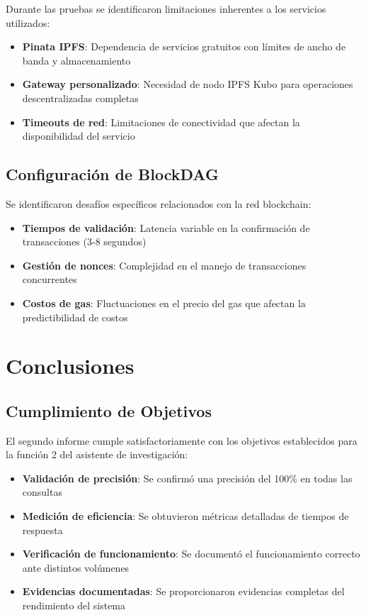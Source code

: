 \documentclass[onecolumn]{article}
\begin{document}
Durante las pruebas se identificaron limitaciones inherentes a los servicios utilizados:

\begin{itemize}
    \item \textbf{Pinata IPFS}: Dependencia de servicios gratuitos con límites de ancho de banda y almacenamiento
    \item \textbf{Gateway personalizado}: Necesidad de nodo IPFS Kubo para operaciones descentralizadas completas
    \item \textbf{Timeouts de red}: Limitaciones de conectividad que afectan la disponibilidad del servicio
\end{itemize}

\subsection{Configuración de BlockDAG}

Se identificaron desafíos específicos relacionados con la red blockchain:

\begin{itemize}
    \item \textbf{Tiempos de validación}: Latencia variable en la confirmación de transacciones (3-8 segundos)
    \item \textbf{Gestión de nonces}: Complejidad en el manejo de transacciones concurrentes
    \item \textbf{Costos de gas}: Fluctuaciones en el precio del gas que afectan la predictibilidad de costos
\end{itemize}

\section{Conclusiones}

\subsection{Cumplimiento de Objetivos}

El segundo informe cumple satisfactoriamente con los objetivos establecidos para la función 2 del asistente de investigación:

\begin{itemize}
    \item \textbf{Validación de precisión}: Se confirmó una precisión del 100\% en todas las consultas
    \item \textbf{Medición de eficiencia}: Se obtuvieron métricas detalladas de tiempos de respuesta
    \item \textbf{Verificación de funcionamiento}: Se documentó el funcionamiento correcto ante distintos volúmenes
    \item \textbf{Evidencias documentadas}: Se proporcionaron evidencias completas del rendimiento del sistema
\end{itemize}
\end{document}
